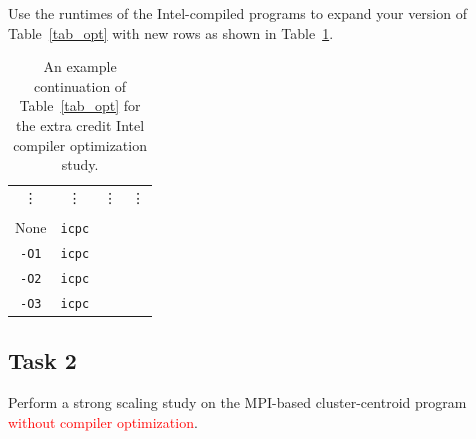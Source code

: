 \begin{itemize}
    Use the runtimes of the Intel-compiled programs to expand your version of Table~\ref{tab_opt} with new rows as shown in Table~\ref{tab_intel_opt}.
    \begin{table}[htbp]
    \centering
    \begin{tabular}{c|c|c|c}
        \vdots&\vdots&\vdots&\vdots\\
        \hphantom{Optimization} & \hphantom{Compiler} & \hphantom{Runtime (seconds)} & \hphantom{Speedup}\\
        None & \texttt{icpc} & & \\
        \hline
        \texttt{-O1} & \texttt{icpc} & \\
        \hline
        \texttt{-O2} & \texttt{icpc} & \\
        \hline
        \texttt{-O3} & \texttt{icpc} & \\
    \end{tabular}
    \caption{An example continuation of Table~\ref{tab_opt} for the extra credit Intel compiler optimization study.}
    \label{tab_intel_opt}
    \end{table}
\end{itemize}

\newpage
\subsection*{Task 2}
Perform a strong scaling study on the MPI-based cluster-centroid program \textcolor{red}{without compiler optimization}.

